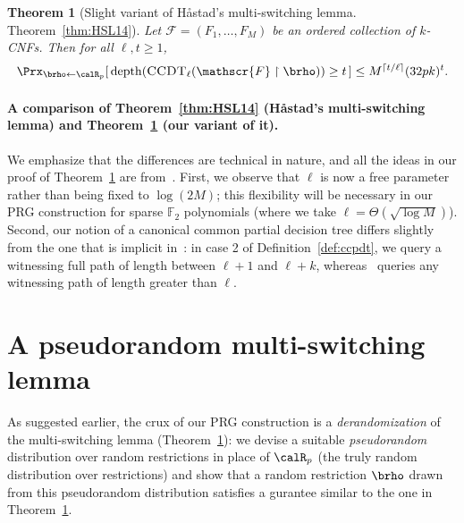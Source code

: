 \documentclass[11pt]{article}
\numberwithin{equation}{section}
\newtheorem{theorem}{Theorem}[section]
\theoremstyle{definition}
\theoremstyle{plain}
\theoremstyle{plain}
\newcommand{\uhr}{\upharpoonright}
\newcommand{\CCDT}{\textsc{CCDT}}
\newcommand{\depth}{\mathrm{depth}}
\renewcommand{\F}{\mathds{F}}
\begin{document}
\begin{theorem}[Slight variant of H{\aa}stad's multi-switching lemma. Theorem~\ref{thm:HSL14}]
\label{thm:HSL14-canonical}
Let $\mathscr{F} = (F_1,\ldots,F_M)$ be an ordered collection of $k$-CNFs. Then for all $\ell, t \ge 1$, 
\[ \Prx_{\brho\leftarrow\calR_p}[\, \depth(\CCDT_{\ell}(\mathscr{F}\uhr\brho)) \ge t\,] \le M^{\lceil t/\ell \rceil}(32pk)^t.  \] 
\end{theorem}


\vspace{-8pt} 
\paragraph{A comparison of Theorem~\ref{thm:HSL14} (H{\aa}stad's multi-switching lemma) and Theorem~\ref{thm:HSL14-canonical} (our variant of it).}  We emphasize that the differences are technical in nature, and all the ideas in our proof of Theorem~\ref{thm:HSL14-canonical} are from~\cite{Has14}. First, we observe that $\ell$ is now a free parameter rather than being fixed to $\log(2M)$; this flexibility will be necessary in our PRG construction for sparse $\F_2$ polynomials (where we take $\ell = \Theta(\sqrt{\log M})$).  Second, our notion of a canonical common partial decision tree differs slightly from the one that is implicit in~\cite{Has14}: in case 2 of Definition~\ref{def:ccpdt}, we query a witnessing full path of length between $\ell+1$ and $\ell+k$, whereas~\cite{Has14} queries any witnessing path of length greater than $\ell$.






\section{A pseudorandom multi-switching lemma} \label{sec:derand-H14}

As suggested earlier, the crux of our PRG construction is a \emph{derandomization} of the multi-switching lemma (Theorem~\ref{thm:HSL14-canonical}): we devise a suitable \emph{pseudorandom} distribution over random restrictions in place of $\calR_p$ (the truly random distribution over restrictions) and show that a random restriction $\brho$ drawn from this pseudorandom distribution satisfies a
%
gurantee similar to the one in %
Theorem~\ref{thm:HSL14-canonical}.
\end{document}
